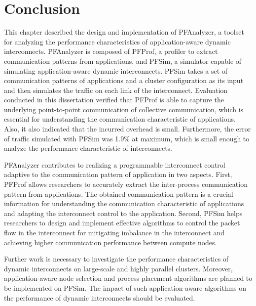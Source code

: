 \section{Conclusion}\label{sec:ii-conclusion}

This chapter described the design and implementation of PFAnalyzer, a
toolset for analyzing the performance characteristics of
application-aware dynamic interconnects. PFAnalyzer is composed of
PFProf, a profiler to extract communication patterns from applications,
and PFSim, a simulator capable of simulating application-aware dynamic
interconnects. PFSim takes a set of communication patterns of
applications and a cluster configuration as its input and then simulates
the traffic on each link of the interconnect. Evaluation conducted in this
dissertation verified that PFProf is able to capture the underlying
point-to-point communication of collective communication, which is essential
for understanding the communication characteristic of applications. Also, it
also indicated that the incurred overhead is small. Furthermore, the error of
traffic simulated with PFSim was 1.9\% at maximum, which is small enough to
analyze the performance characteristic of interconnects.

PFAnalyzer contributes to realizing a programmable interconnect control
adaptive to the communication pattern of application in two aspects. First,
PFProf allows researchers to accurately extract the inter-process
communication pattern from applications. The obtained communication pattern is
a crucial information for understanding the communication characteristic of
applications and adapting the interconnect control to the application. Second,
PFSim helps researchers to design and implement effective algorithms to
control the packet flow in the interconnect for mitigating imbalance in the
interconnect and achieving higher communication performance between compute
nodes.

Further work is necessary to investigate the performance characteristics of
dynamic interconnects on large-scale and highly parallel clusters. Moreover,
application-aware node selection and process placement algorithms are planned
to be implemented on PFSim. The impact of such application-aware algorithms on
the performance of dynamic interconnects should be evaluated.
